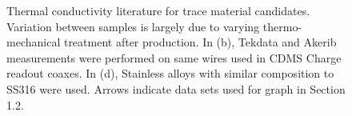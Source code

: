 \documentclass{report}
\begin{document}
\begin{figure}[h]
\begin{centering}

\caption{Thermal conductivity literature for trace material candidates. Variation between samples is largely due to varying thermo-mechanical treatment after production. In (b), Tekdata and Akerib measurements were performed on same wires used in CDMS Charge readout coaxes. In (d), Stainless alloys with similar composition to SS316 were used. Arrows indicate data sets used for graph in Section 1.2.}
\end{centering}
\end{figure}
\end{document}
